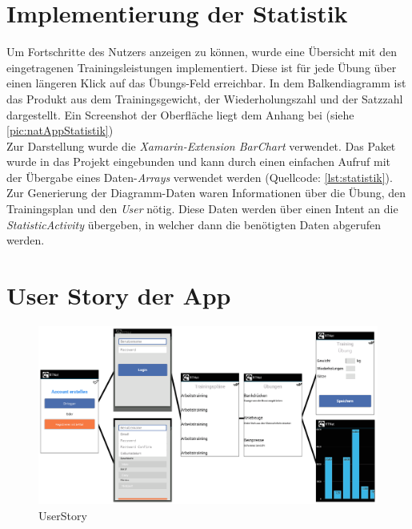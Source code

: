 \section{Implementierung der Statistik}
\label{sec:implementierung-statistik}
Um Fortschritte des Nutzers anzeigen zu können, wurde eine Übersicht mit den eingetragenen Trainingsleistungen implementiert. Diese ist für jede Übung über einen längeren Klick auf das Übungs-Feld erreichbar. In dem Balkendiagramm ist das Produkt aus dem Trainingsgewicht, der Wiederholungszahl und der Satzzahl dargestellt. Ein Screenshot der Oberfläche liegt dem Anhang bei (siehe \ref{pic:natAppStatistik})\\
Zur Darstellung wurde die \textit{Xamarin-Extension BarChart} verwendet. Das Paket  wurde in das Projekt eingebunden und kann durch einen einfachen Aufruf mit der Übergabe eines Daten-\textit{Arrays} verwendet werden (Quellcode: \ref{lst:statistik}).\\
Zur Generierung der Diagramm-Daten waren Informationen über die Übung, den Trainingsplan und den \textit{User} nötig. Diese Daten werden über einen Intent an die \textit{StatisticActivity} übergeben, in welcher dann die benötigten Daten abgerufen werden.


\section{User Story der App}
\label{sec:user-story}
\begin{figure}[!htbp]
\centering
\includegraphics[width=\textwidth, angle={90}]{content/images/UserStory}
\caption{UserStory}
\label{pic:UserStory}
\end{figure}


